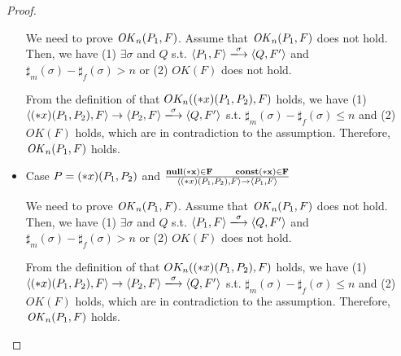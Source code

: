 \begin{proof}
\begin{itemize}
  We need to prove \(\mathit{OK}_n(P_1, F)\).  Assume that \(\mathit{OK}_n(P_1, F)\)
  does not hold. Then, we have (1) \( \exists \sigma \) and \(Q\)
  s.t. \( \langle P_1, F \rangle \xlongrightarrow{\sigma} \langle Q,
  F' \rangle \) and \(\sharp_{m}(\sigma) - \sharp_{f}(\sigma) > n\) or
  (2) \( OK(F)\) does not hold.

  From the definition of that \(OK_n((*x)(P_1, P_2), F)\) holds, we
  have (1) \( \langle \Sirx(P_1, P_2), F \rangle \rightarrow \langle
  P_2, F \rangle \xlongrightarrow{\sigma} \langle Q, F' \rangle \)
  s.t. \(\sharp_m(\sigma) - \sharp_f(\sigma) \le n \) and (2)
  \(OK(F)\) holds, which are in contradiction to the assumption.
  Therefore, \(\mathit{OK}_n(P_1, F)\) holds.

\item Case \( P = (*x)(P_1,P_2) \) and \( \frac{ \bf{null}(*x) \in F
  \quad\quad \mathbf{const}(*x) \in F} { \langle (*x)(P_1, P_2), F \rangle
  \rightarrow \langle P_1, F \rangle } \)

  We need to prove \(\mathit{OK}_n(P_1, F)\).  Assume that \(\mathit{OK}_n(P_1, F)\)
  does not hold. Then, we have (1) \( \exists \sigma \) and \(Q\)
  s.t. \( \langle P_1, F \rangle \xlongrightarrow{\sigma} \langle Q,
  F' \rangle \) and \(\sharp_{m}(\sigma) - \sharp_{f}(\sigma) > n\) or
  (2) \( OK(F)\) does not hold.

  From the definition of that \(OK_n((*x)(P_1, P_2), F)\) holds, we
  have (1) \( \langle \Sirx(P_1, P_2), F \rangle \rightarrow \langle
  P_2, F \rangle \xlongrightarrow{\sigma} \langle Q, F' \rangle \)
  s.t. \(\sharp_m(\sigma) - \sharp_f(\sigma) \le n \) and (2)
  \(OK(F)\) holds, which are in contradiction to the assumption.
  Therefore, \(\mathit{OK}_n(P_1, F)\) holds.
   

\end{itemize}

\end{proof}

